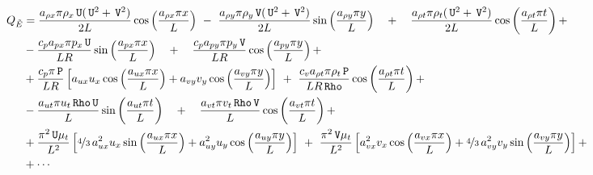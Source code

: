 \documentclass[10pt]{article}
\newcommand{\Rho}{\,\mathtt{Rho}}
\newcommand{\PP}{\,\mathtt{P}}
\newcommand{\U}{\,\mathtt{U}}
\newcommand{\V}{\,\mathtt{V}}
\newcommand{\tE}{\tilde{E}}
\begin{document}
\begin{equation*}
 \begin{split}
Q_{\tE}&= \dfrac{ a_{\rho x} \pi \rho_x \U(\U^2+\V^2) }{2L}\cos\left(\dfrac{a_{\rho x} \pi x}{L}\right)\,\, -\,\,\dfrac{ a_{\rho y} \pi \rho_y \V(\U^2+ \V^2) }{2L}\sin\left(\dfrac{a_{\rho y} \pi y}{L}\right)\quad +\quad \dfrac{a_{\rho t} \pi \rho_t (\U^2+\V^2) }{2L}\cos\left(\dfrac{a_{\rho t} \pi t}{L}\right)+\\
&-\dfrac{c_p a_{px} \pi p_x \U }{LR}\sin\left(\dfrac{a_{px} \pi x}{L}\right)\quad+\quad\dfrac{c_p a_{py} \pi p_y \V }{LR}\cos\left(\dfrac{a_{py} \pi y}{L}\right)+\\
&+\dfrac{c_p \pi \PP}{LR}\left[a_{ux} u_x \cos\left(\dfrac{a_{ux} \pi x}{L}\right)+a_{vy} v_y \cos\left(\dfrac{a_{vy} \pi y}{L}\right)\right] \,\,+\,\,\dfrac{c_v a_{\rho t} \pi \rho_t \PP }{L R \Rho}\cos\left(\dfrac{a_{\rho t} \pi t}{L}\right) +\\
&-\dfrac{a_{ut} \pi u_t \Rho \U }{L}\sin\left(\dfrac{a_{ut} \pi t}{L}\right)\quad+\quad\dfrac{a_{vt} \pi v_t \Rho \V }{L}\cos\left(\dfrac{a_{vt} \pi t}{L}\right)+\\
&+ \dfrac{\pi^2  \U \mu_t}{L^2}\left[\nicefrac{4}{3}\, a_{ux}^2 u_x \sin\left(\dfrac{a_{ux} \pi x}{L}\right)+a_{uy}^2 u_y \cos\left(\dfrac{a_{uy} \pi y}{L}\right)\right]\,\,+\,\,\dfrac{\pi^2  \V \mu_t}{L^2}\left[a_{vx}^2 v_x \cos\left(\dfrac{a_{vx} \pi x}{L}\right)+\nicefrac{4}{3}\, a_{vy}^2 v_y \sin\left(\dfrac{a_{vy} \pi y}{L}\right)\right] +\\
&+\cdots
 \end{split}
\end{equation*}
\end{document}
